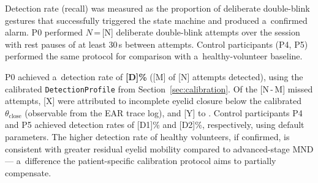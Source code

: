 Detection rate (recall) was measured as the proportion of deliberate double-blink
gestures that successfully triggered the state machine and produced a~confirmed
alarm. P0 performed $N$\,=\,[N] deliberate double-blink attempts over the session
with rest pauses of at least 30\,s between attempts. Control participants (P4, P5)
performed the same protocol for comparison with a~healthy-volunteer baseline.

P0 achieved a~detection rate of \textbf{[D]\%} ([M] of [N] attempts detected),
using the calibrated \texttt{DetectionProfile} from Section~\ref{sec:calibration}.
Of the [N\,-\,M] missed attempts, [X] were attributed to incomplete eyelid closure
below the calibrated $\theta_\text{close}$ (observable from the EAR trace log),
and [Y] to . Control participants P4 and P5 achieved detection rates of [D1]\% and
[D2]\%, respectively, using default parameters. The higher detection rate of
healthy volunteers, if confirmed, is consistent with greater residual eyelid
mobility compared to advanced-stage MND — a~difference the patient-specific
calibration protocol aims to partially compensate.